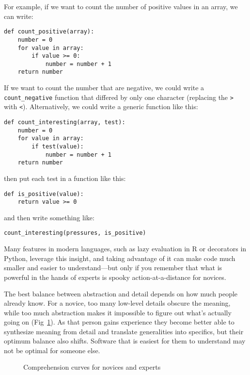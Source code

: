 \documentclass[10pt,letterpaper]{article}
\begin{document}
For example,
if we want to count the number of positive values in an array,
we can write:

\begin{lstlisting}
def count_positive(array):
    number = 0
    for value in array:
        if value >= 0:
            number = number + 1
    return number
\end{lstlisting}

If we want to count the number that are negative,
we could write a \texttt{count\_negative} function that differed by only one character
(replacing the \texttt{>} with \texttt{<}).
Alternatively,
we could write a generic function like this:

\begin{lstlisting}
def count_interesting(array, test):
    number = 0
    for value in array:
        if test(value):
            number = number + 1
    return number
\end{lstlisting}

\noindent
then put each test in a function like this:

\begin{lstlisting}
def is_positive(value):
    return value >= 0
\end{lstlisting}

\noindent
and then write something like:

\begin{lstlisting}
count_interesting(pressures, is_positive)
\end{lstlisting}

Many features in modern languages,
such as lazy evaluation in R or decorators in Python,
leverage this insight,
and taking advantage of it can make code much smaller
and easier to understand---but only if you remember that
what is powerful in the hands of experts is spooky action-at-a-distance for novices.

The best balance between abstraction and detail
depends on how much people already know.
For a novice,
too many low-level details obscure the meaning,
while too much abstraction makes it impossible to figure out what's actually going on
(\colorbox{green!30}{Fig~\ref{comprehension}}).
As that person gains experience
they become better able to synthesize meaning from detail
and translate generalities into specifics,
but their optimum balance also shifts.
Software that is easiest for them to understand may not be optimal for someone else.

\begin{figure}
  \centering
  \caption{Comprehension curves for novices and experts}
  \label{comprehension}
\end{figure}
\end{document}
